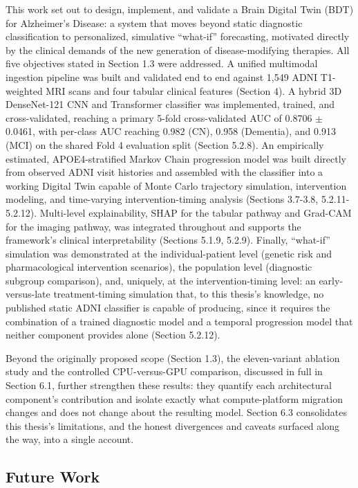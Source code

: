 \documentclass[pdflatex,sn-mathphys-num]{sn-jnl}%
\theoremstyle{thmstyleone}%
\theoremstyle{thmstyletwo}%
\theoremstyle{thmstylethree}%
\begin{document}
This work set out to design, implement, and validate a Brain Digital Twin (BDT) for Alzheimer's Disease: a system that moves beyond static diagnostic classification to personalized, simulative ``what-if'' forecasting, motivated directly by the clinical demands of the new generation of disease-modifying therapies. All five objectives stated in Section 1.3 were addressed. A unified multimodal ingestion pipeline was built and validated end to end against 1,549 ADNI T1-weighted MRI scans and four tabular clinical features (Section 4). A hybrid 3D DenseNet-121 CNN and Transformer classifier was implemented, trained, and cross-validated, reaching a primary 5-fold cross-validated AUC of 0.8706 $\pm$ 0.0461, with per-class AUC reaching 0.982 (CN), 0.958 (Dementia), and 0.913 (MCI) on the shared Fold 4 evaluation split (Section 5.2.8). An empirically estimated, APOE4-stratified Markov Chain progression model was built directly from observed ADNI visit histories and assembled with the classifier into a working Digital Twin capable of Monte Carlo trajectory simulation, intervention modeling, and time-varying intervention-timing analysis (Sections 3.7-3.8, 5.2.11-5.2.12). Multi-level explainability, SHAP for the tabular pathway and Grad-CAM for the imaging pathway, was integrated throughout and supports the framework's clinical interpretability (Sections 5.1.9, 5.2.9). Finally, ``what-if'' simulation was demonstrated at the individual-patient level (genetic risk and pharmacological intervention scenarios), the population level (diagnostic subgroup comparison), and, uniquely, at the intervention-timing level: an early-versus-late treatment-timing simulation that, to this thesis's knowledge, no published static ADNI classifier is capable of producing, since it requires the combination of a trained diagnostic model and a temporal progression model that neither component provides alone (Section 5.2.12).

Beyond the originally proposed scope (Section 1.3), the eleven-variant ablation study and the controlled CPU-versus-GPU comparison, discussed in full in Section 6.1, further strengthen these results: they quantify each architectural component's contribution and isolate exactly what compute-platform migration changes and does not change about the resulting model. Section 6.3 consolidates this thesis's limitations, and the honest divergences and caveats surfaced along the way, into a single account.

\subsection{Future Work}\label{sec7_2}
\end{document}
